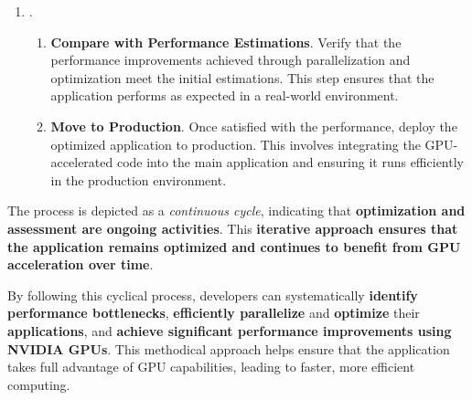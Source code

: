 \begin{enumerate}
    \newpage

    \item {}.
    \begin{enumerate}
        \item \textbf{Compare with Performance Estimations}. Verify that the performance improvements achieved through parallelization and optimization meet the initial estimations. This step ensures that the application performs as expected in a real-world environment.

        \item \textbf{Move to Production}. Once satisfied with the performance, deploy the optimized application to production. This involves integrating the GPU-accelerated code into the main application and ensuring it runs efficiently in the production environment.
    \end{enumerate}
\end{enumerate}
The process is depicted as a \emph{continuous cycle}, indicating that \textbf{optimization and assessment are ongoing activities}. This \textbf{iterative approach ensures that the application remains optimized and continues to benefit from GPU acceleration over time}.

\highspace
By following this cyclical process, developers can systematically \textbf{identify performance bottlenecks}, \textbf{efficiently parallelize} and \textbf{optimize} their \textbf{applications}, and \textbf{achieve significant performance improvements using NVIDIA GPUs}. This methodical approach helps ensure that the application takes full advantage of GPU capabilities, leading to faster, more efficient computing.